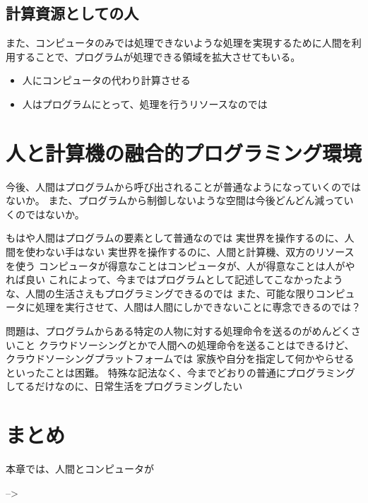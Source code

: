 \subsection{計算資源としての人}\label{ux8a08ux7b97ux8cc7ux6e90ux3068ux3057ux3066ux306eux4eba}

また、コンピュータのみでは処理できないような処理を実現するために人間を利用することで、プログラムが処理できる領域を拡大させてもいる。

\begin{itemize}
\itemsep1pt\parskip0pt
\item
  人にコンピュータの代わり計算させる
\item
  人はプログラムにとって、処理を行うリソースなのでは
\end{itemize}

\section{人と計算機の融合的プログラミング環境}\label{ux4ebaux3068ux8a08ux7b97ux6a5fux306eux878dux5408ux7684ux30d7ux30edux30b0ux30e9ux30dfux30f3ux30b0ux74b0ux5883}

今後、人間はプログラムから呼び出されることが普通なようになっていくのではないか。
また、プログラムから制御しないような空間は今後どんどん減っていくのではないか。

もはや人間はプログラムの要素として普通なのでは
実世界を操作するのに、人間を使わない手はない
実世界を操作するのに、人間と計算機、双方のリソースを使う
コンピュータが得意なことはコンピュータが、人が得意なことは人がやれば良い
これによって、今まではプログラムとして記述してこなかったような、人間の生活さえもプログラミングできるのでは
また、可能な限りコンピュータに処理を実行させて、人間は人間にしかできないことに専念できるのでは？

問題は、プログラムからある特定の人物に対する処理命令を送るのがめんどくさいこと
クラウドソーシングとかで人間への処理命令を送ることはできるけど、クラウドソーシングプラットフォームでは
家族や自分を指定して何かやらせるといったことは困難。
特殊な記法なく、今までどおりの普通にプログラミングしてるだけなのに、日常生活をプログラミングしたい

\section{まとめ}\label{ux307eux3068ux3081}

本章では、人間とコンピュータが

--\textgreater{}
